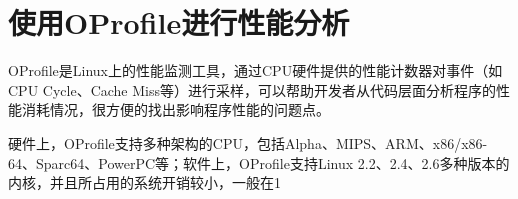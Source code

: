 \chapter{使用OProfile进行性能分析}

OProfile是Linux上的性能监测工具，通过CPU硬件提供的性能计数器对事件（如CPU Cycle、Cache Miss等）进行采样，可以帮助开发者从代码层面分析程序的性能消耗情况，很方便的找出影响程序性能的问题点。

硬件上，OProfile支持多种架构的CPU，包括Alpha、MIPS、ARM、x86/x86-64、Sparc64、PowerPC等；软件上，OProfile支持Linux 2.2、2.4、2.6多种版本的内核，并且所占用的系统开销较小，一般在1%
